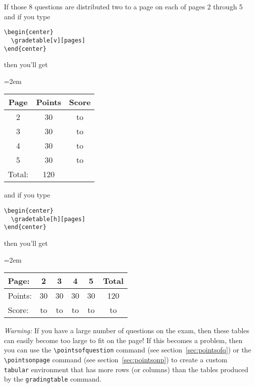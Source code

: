 \documentclass[12pt]{exam}
\begin{document}
If those 8 questions are distributed two to a page on each of pages 2
through 5 and if you type
\begin{verbatim}
\begin{center}
  \gradetable[v][pages]
\end{center}
\end{verbatim}
then you'll get
\begin{center}
  \cwidth=2em
  \renewcommand\arraystretch{1.5}
  \begin{tabular}{|c|c|c|}
    \hline
    Page& Points& Score\\
    \hline
    2& 30& \hbox to \cwidth{\hfill}\\
    \hline
    3& 30& \hbox to \cwidth{\hfill}\\
    \hline
    4& 30& \hbox to \cwidth{\hfill}\\
    \hline
    5& 30& \hbox to \cwidth{\hfill}\\
    \hline
    Total:& 120&\\
    \hline
  \end{tabular}
\end{center}
and if you type
\begin{verbatim}
\begin{center}
  \gradetable[h][pages]
\end{center}
\end{verbatim}
then you'll get
\begin{center}
  \cwidth=2em
  \renewcommand\arraystretch{1.5}
  \begin{tabular}{|l|c|c|c|c|c|}
    \hline
    Page:& 2& 3& 4& 5& Total\\
    \hline
    Points:&
    30&
    30&
    30&
    30&
    120\\
    \hline
    Score:&
    \hbox to \cwidth{\hfill}&
    \hbox to \cwidth{\hfill}&
    \hbox to \cwidth{\hfill}&
    \hbox to \cwidth{\hfill}&
    \hbox to \cwidth{\hfill}
    \\
    \hline
  \end{tabular}
\end{center}

\medskip 

\noindent \emph{Warning:} If you have a large number of questions on
the exam, then these tables can easily become too large to fit on the
page!  If this becomes a problem, then you can use the
\verb"\pointsofquestion" command (see section~\ref{sec:pointsofq}) or
the \verb"\pointsonpage" command (see section~\ref{sec:pointsonp}) to
create a custom \verb"tabular" environment that has more rows (or
columns) than the tables produced by the \verb"gradingtable" command.
\end{document}
